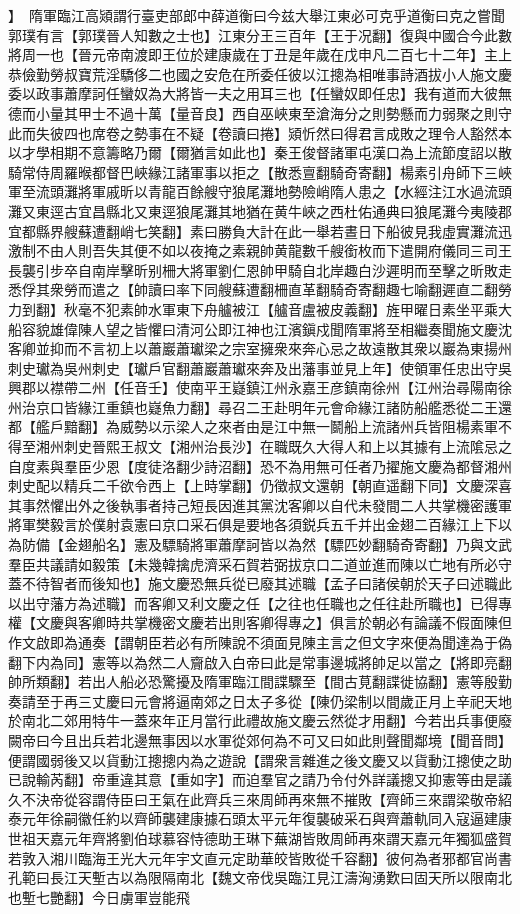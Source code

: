 】　隋軍臨江高熲謂行臺吏部郎中薛道衡曰今兹大舉江東必可克乎道衡曰克之嘗聞郭璞有言【郭璞晉人知數之士也】江東分王三百年【王于况翻】復與中國合今此數將周一也【晉元帝南渡即王位於建康歲在丁丑是年歲在戊申凡二百七十二年】主上恭儉勤勞叔寶荒淫驕侈二也國之安危在所委任彼以江摠為相唯事詩酒拔小人施文慶委以政事蕭摩訶任蠻奴為大將皆一夫之用耳三也【任蠻奴即任忠】我有道而大彼無德而小量其甲士不過十萬【量音良】西自巫峽東至滄海分之則勢懸而力弱聚之則守此而失彼四也席卷之勢事在不疑【卷讀曰捲】熲忻然曰得君言成敗之理令人豁然本以才學相期不意籌略乃爾【爾猶言如此也】秦王俊督諸軍屯漢口為上流節度詔以散騎常侍周羅㬋都督巴峽緣江諸軍事以拒之【散悉亶翻騎奇寄翻】楊素引舟師下三峽軍至流頭灘將軍戚昕以青龍百餘艘守狼尾灘地勢險峭隋人患之【水經注江水過流頭灘又東逕古宜昌縣北又東逕狼尾灘其地猶在黄牛峽之西杜佑通典曰狼尾灘今夷陵郡宜都縣界艘蘇遭翻峭七笑翻】素曰勝負大計在此一舉若晝日下船彼見我虛實灘流迅激制不由人則吾失其便不如以夜掩之素親帥黄龍數千艘銜枚而下遣開府儀同三司王長襲引步卒自南岸擊昕别柵大將軍劉仁恩帥甲騎自北岸趣白沙遲明而至擊之昕敗走悉俘其衆勞而遣之【帥讀曰率下同艘蘇遭翻柵直革翻騎奇寄翻趣七喻翻遲直二翻勞力到翻】秋毫不犯素帥水軍東下舟艫被江【艫音盧被皮義翻】旌甲曜日素坐平乘大船容貌雄偉陳人望之皆懼曰清河公即江神也江濱鎭戍聞隋軍將至相繼奏聞施文慶沈客卿並抑而不言初上以蕭巖蕭瓛梁之宗室擁衆來奔心忌之故遠散其衆以巖為東揚州刺史瓛為吳州刺史【瓛戶官翻蕭巖蕭瓛來奔及出藩事並見上年】使領軍任忠出守吳興郡以襟帶二州【任音壬】使南平王嶷鎮江州永嘉王彦鎮南徐州【江州治尋陽南徐州治京口皆緣江重鎮也嶷魚力翻】尋召二王赴明年元會命緣江諸防船艦悉從二王還都【艦戶黯翻】為威勢以示梁人之來者由是江中無一鬬船上流諸州兵皆阻楊素軍不得至湘州刺史晉熙王叔文【湘州治長沙】在職既久大得人和上以其據有上流隂忌之自度素與羣臣少恩【度徒洛翻少詩沼翻】恐不為用無可任者乃擢施文慶為都督湘州刺史配以精兵二千欲令西上【上時掌翻】仍徵叔文還朝【朝直遥翻下同】文慶深喜其事然懼出外之後執事者持己短長因進其黨沈客卿以自代未發間二人共掌機密護軍將軍樊毅言於僕射袁憲曰京口采石俱是要地各須鋭兵五千并出金翅二百緣江上下以為防備【金翅船名】憲及驃騎將軍蕭摩訶皆以為然【驃匹妙翻騎奇寄翻】乃與文武羣臣共議請如毅策【未幾韓擒虎濟采石賀若弼拔京口二道並進而陳以亡地有所必守蓋不待智者而後知也】施文慶恐無兵從已廢其述職【孟子曰諸侯朝於天子曰述職此以出守藩方為述職】而客卿又利文慶之任【之往也任職也之任往赴所職也】已得專權【文慶與客卿時共掌機密文慶若出則客卿得專之】俱言於朝必有論議不假面陳但作文啟即為通奏【謂朝臣若必有所陳說不須面見陳主言之但文字來便為聞達為于偽翻下内為同】憲等以為然二人齎啟入白帝曰此是常事邊城將帥足以當之【將即亮翻帥所類翻】若出人船必恐驚擾及隋軍臨江間諜驟至【間古莧翻諜徙協翻】憲等殷勤奏請至于再三丈慶曰元會將逼南郊之日太子多從【陳仍梁制以間歲正月上辛祀天地於南北二郊用特牛一蓋來年正月當行此禮故施文慶云然從才用翻】今若出兵事便廢闕帝曰今且出兵若北邊無事因以水軍從郊何為不可又曰如此則聲聞鄰境【聞音問】便謂國弱後又以貨動江摠摠内為之遊說【謂衆言雜進之後文慶又以貨動江摠使之助已說輸芮翻】帝重違其意【重如字】而迫羣官之請乃令付外詳議摠又抑憲等由是議久不決帝從容謂侍臣曰王氣在此齊兵三來周師再來無不摧敗【齊師三來謂梁敬帝紹泰元年徐嗣徽任約以齊師襲建康據石頭太平元年復襲破采石與齊蕭軌同入寇逼建康世祖天嘉元年齊將劉伯球慕容恃德助王琳下蕪湖皆敗周師再來謂天嘉元年獨狐盛賀若敦入湘川臨海王光大元年宇文直元定助華皎皆敗從千容翻】彼何為者邪都官尚書孔範曰長江天塹古以為限隔南北【魏文帝伐吳臨江見江濤洶湧歎曰固天所以限南北也塹七艷翻】今日虜軍豈能飛